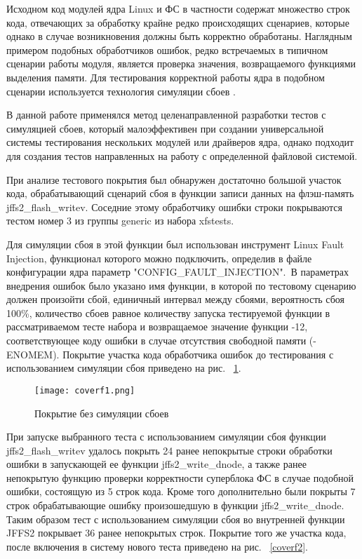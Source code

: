 Исходном код модулей ядра Linux и ФС в частности содержат множество строк кода, отвечающих за обработку крайне редко происходящих сценариев, которые однако в случае возникновения должны быть корректно обработаны. Наглядным примером подобных обработчиков ошибок, редко встречаемых в типичном сценарии работы модуля, является проверка значения, возвращаемого функциями выделения памяти. Для тестирования корректной работы ядра в подобном сценарии используется технология симуляции сбоев \cite{faultuse}.

В данной работе применялся метод целенаправленной разработки тестов с симуляцией сбоев, который малоэффективен при создании универсальной системы тестирования нескольких модулей или драйверов ядра, однако подходит для создания тестов направленных на работу с определенной файловой системой.

При анализе тестового покрытия был обнаружен достаточно большой участок кода, обрабатывающий сценарий сбоя в функции записи данных на флэш-память jffs2\_flash\_writev. Соседние этому обработчику ошибки строки покрываются тестом номер 3 из группы generic из набора xfstests. 

Для симуляции сбоя в этой функции был использован инструмент Linux Fault Injection, функционал которого можно подключить, определив в файле конфигурации ядра параметр "CONFIG\_FAULT\_INJECTION".\ В параметрах внедрения ошибок было указано имя функции, в которой по тестовому сценарию должен произойти сбой, единичный интервал между сбоями, вероятность сбоя 100\%, количество сбоев равное количеству запуска тестируемой функции в рассматриваемом тесте набора и возвращаемое значение функции -12, соответствующее коду ошибки в случае отсутствия свободной памяти (-ENOMEM). Покрытие участка кода обработчика ошибок до тестирования с использованием симуляции сбоя приведено на рис. ~\ref{coverf1}.

\begin{figure}[H]
	\centering
	\texttt{[image: coverf1.png]}
	\caption{Покрытие без симуляции сбоев}
	\label{coverf1}
\end{figure}

При запуске выбранного теста с использованием симуляции сбоя функции jffs2\_flash\_writev удалось покрыть 24 ранее непокрытые строки обработки ошибки в запускающей ее функции jffs2\_write\_dnode, а также ранее непокрытую функцию проверки корректности суперблока ФС в случае подобной ошибки, состоящую из 5 строк кода. Кроме того дополнительно были покрыты 7 строк обрабатывающие ошибку произошедшую в функции jffs2\_write\_dnode. Таким образом тест с использованием симуляции сбоя во внутренней функции JFFS2 покрывает 36 ранее непокрытых строк. Покрытие того же участка кода, после включения в систему нового теста приведено на рис. ~\ref{coverf2}.


